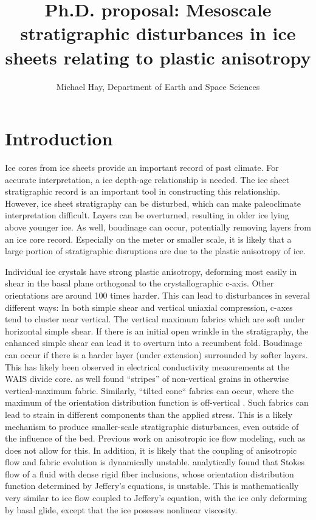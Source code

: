 \documentclass{report}
\begin{document}
\title{Ph.D. proposal: Mesoscale stratigraphic disturbances in ice sheets relating to plastic anisotropy}

\author{Michael Hay,
Department of Earth and Space Sciences}

\maketitle 

\section{Introduction}
Ice cores from ice sheets provide an important record of past climate.  For accurate interpretation, a ice depth-age relationship is needed. The ice sheet stratigraphic record is an important tool in constructing this relationship. However, ice sheet stratigraphy can be disturbed, which can make paleoclimate interpretation difficult. Layers can be overturned, resulting in older ice lying above younger ice. As well, boudinage can occur, potentially removing layers from an ice core record. Especially on the meter or smaller scale, it is likely that a large portion of stratigraphic disruptions are due to the plastic anisotropy of ice.

 Individual ice crystals have strong plastic anisotropy, deforming most easily in shear in the basal plane orthogonal to the crystallographic c-axis. Other orientations are around 100 times harder. This can lead to disturbances in several different ways: In both simple shear and vertical uniaxial compression, c-axes tend to cluster near vertical. The vertical maximum fabrics which are soft under horizontal simple shear. If there is an initial open wrinkle in the stratigraphy, the enhanced simple shear can lead it to overturn into a recumbent fold. Boudinage can occur if there is a harder layer (under extension) surrounded by softer layers. This has likely been observed in electrical conductivity measurements at the WAIS divide core. \citet{alley97} as well found ``stripes'' of non-vertical grains in otherwise vertical-maximum fabric. Similarly, ``tilted cone`` fabrics can occur, where the maximum of the orientation distribution function is off-vertical \citep{throstur2002}. Such fabrics can lead to strain in different components than the applied stress. This is a likely mechanism to produce smaller-scale stratigraphic disturbances, even outside of the influence of the bed. Previous work on anisotropic ice flow modeling, such as \citet{gillet2005} does not allow for this. In addition, it is likely that the coupling of anisotropic flow and fabric evolution is dynamically unstable. \citet{montgomery-smith2011} analytically found that Stokes flow of a fluid with dense rigid fiber inclusions, whose orientation distribution function determined by Jeffery's equations, is unstable. This is mathematically very similar to ice flow coupled to Jeffery's equation, with the ice only deforming by basal glide, except that the ice posesses nonlinear viscosity.
\end{document}
